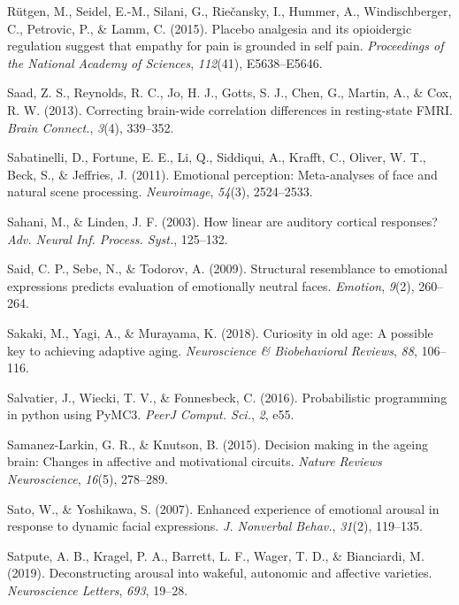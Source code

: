 \documentclass[12pt,american,a4paper,oneside,]{memoir} %
\begin{document}
\leavevmode\hypertarget{ref-rutgen2015placebo}{}%
Rütgen, M., Seidel, E.-M., Silani, G., Riečansky, I., Hummer, A., Windischberger, C., Petrovic, P., \& Lamm, C. (2015). Placebo analgesia and its opioidergic regulation suggest that empathy for pain is grounded in self pain. \emph{Proceedings of the National Academy of Sciences}, \emph{112}(41), E5638--E5646.

\leavevmode\hypertarget{ref-Saad2013-zd}{}%
Saad, Z. S., Reynolds, R. C., Jo, H. J., Gotts, S. J., Chen, G., Martin, A., \& Cox, R. W. (2013). Correcting brain-wide correlation differences in resting-state FMRI. \emph{Brain Connect.}, \emph{3}(4), 339--352.

\leavevmode\hypertarget{ref-sabatinelli2011emotional}{}%
Sabatinelli, D., Fortune, E. E., Li, Q., Siddiqui, A., Krafft, C., Oliver, W. T., Beck, S., \& Jeffries, J. (2011). Emotional perception: Meta-analyses of face and natural scene processing. \emph{Neuroimage}, \emph{54}(3), 2524--2533.

\leavevmode\hypertarget{ref-Sahani2003-kk}{}%
Sahani, M., \& Linden, J. F. (2003). How linear are auditory cortical responses? \emph{Adv. Neural Inf. Process. Syst.}, 125--132.

\leavevmode\hypertarget{ref-Said2009-tf}{}%
Said, C. P., Sebe, N., \& Todorov, A. (2009). Structural resemblance to emotional expressions predicts evaluation of emotionally neutral faces. \emph{Emotion}, \emph{9}(2), 260--264.

\leavevmode\hypertarget{ref-sakaki2018curiosity}{}%
Sakaki, M., Yagi, A., \& Murayama, K. (2018). Curiosity in old age: A possible key to achieving adaptive aging. \emph{Neuroscience \& Biobehavioral Reviews}, \emph{88}, 106--116.

\leavevmode\hypertarget{ref-Salvatier2016-ko}{}%
Salvatier, J., Wiecki, T. V., \& Fonnesbeck, C. (2016). Probabilistic programming in python using PyMC3. \emph{PeerJ Comput. Sci.}, \emph{2}, e55.

\leavevmode\hypertarget{ref-samanez2015decision}{}%
Samanez-Larkin, G. R., \& Knutson, B. (2015). Decision making in the ageing brain: Changes in affective and motivational circuits. \emph{Nature Reviews Neuroscience}, \emph{16}(5), 278--289.

\leavevmode\hypertarget{ref-Sato2007-ah}{}%
Sato, W., \& Yoshikawa, S. (2007). Enhanced experience of emotional arousal in response to dynamic facial expressions. \emph{J. Nonverbal Behav.}, \emph{31}(2), 119--135.

\leavevmode\hypertarget{ref-satpute2019deconstructing}{}%
Satpute, A. B., Kragel, P. A., Barrett, L. F., Wager, T. D., \& Bianciardi, M. (2019). Deconstructing arousal into wakeful, autonomic and affective varieties. \emph{Neuroscience Letters}, \emph{693}, 19--28.
\end{document}
